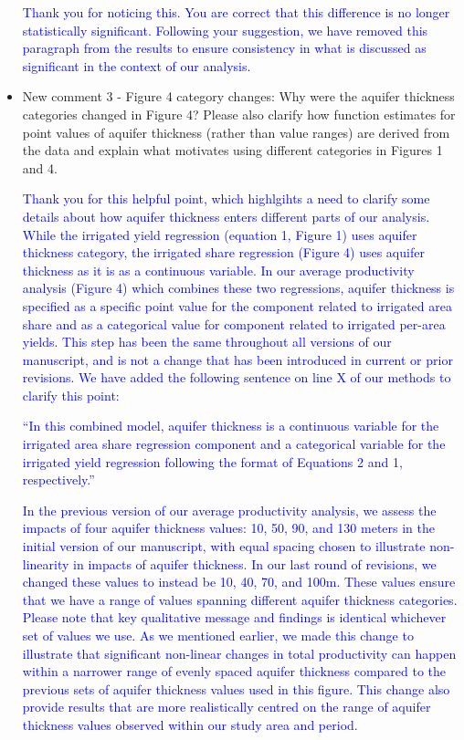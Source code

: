 \documentclass[
]{article}
\begin{document}
\begin{itemize}
    \textcolor{blue}{Thank you for noticing this. You are correct that this difference is no longer statistically significant. Following your suggestion, we have removed this paragraph from the results to ensure consistency in what is discussed as significant in the context of our analysis.}

\item New comment 3 - Figure 4 category changes: Why were the aquifer thickness categories changed in Figure 4? Please also clarify how function estimates for point values of aquifer thickness (rather than value ranges) are derived from the data and explain what motivates using different categories in Figures 1 and 4.


    \textcolor{blue}{Thank you for this helpful point, which highlgihts a need to clarify some details about how aquifer thickness enters different parts of our analysis. While the irrigated yield regression (equation 1, Figure 1) uses aquifer thickness category, the irrigated share regression (Figure 4) uses aquifer thickness as it is as a continuous variable. In our average productivity analysis (Figure 4) which combines these two regressions, aquifer thickness is specified as a specific point value for the component related to irrigated area share and as a categorical value for component related to irrigated per-area yields. This step has been the same throughout all versions of our manuscript, and is not a change that has been introduced in current or prior revisions. We have added the following sentence on line X of our methods to clarify this point:}

    \textcolor{blue}{``In this combined model, aquifer thickness is a continuous variable for the irrigated area share regression component and a categorical variable for the irrigated yield regression following the format of Equations 2 and 1, respectively.''}
    
    \textcolor{blue}{In the previous version of our average productivity analysis, we assess the impacts of four aquifer thickness values: 10, 50, 90, and 130 meters in the initial version of our manuscript, with equal spacing chosen to illustrate non-linearity in impacts of aquifer thickness. In our last round of revisions, we changed these values to instead be 10, 40, 70, and 100m. These values ensure that we have a range of values spanning different aquifer thickness categories. Please note that key qualitative message and findings is identical whichever set of values we use. As we mentioned earlier, we made this change to illustrate that significant non-linear changes in total productivity can happen within a narrower range of evenly spaced aquifer thickness compared to the previous sets of aquifer thickness values used in this figure. This change also provide results that are more realistically centred on the range of aquifer thickness values observed within our study area and period.} 


\end{itemize}
\end{document}
